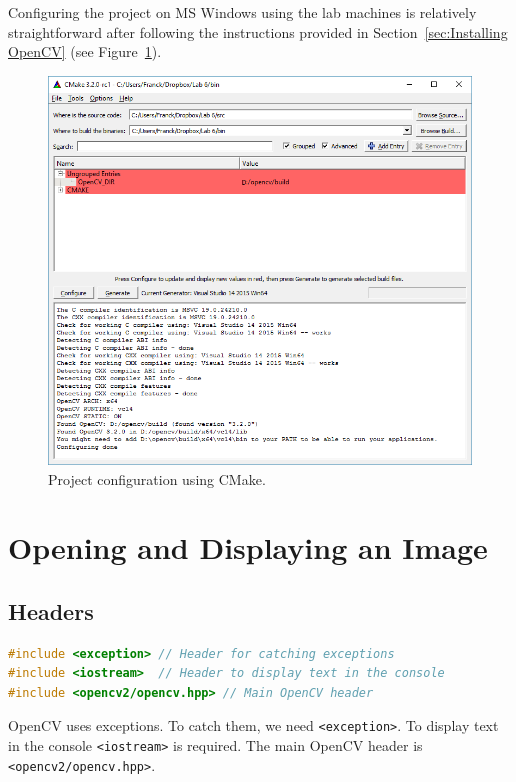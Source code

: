 \documentclass[english,a4paper,12pt,oneside]{article}
\begin{document}
Configuring the project on MS Windows using the lab machines is relatively straightforward after following the instructions provided in Section~\ref{sec:Installing OpenCV} (see Figure~\ref{fig:config proj}). 
	\begin{figure}[tbhp]
	\includegraphics[width=\textwidth]{cmake}
	\caption{\label{fig:config proj}Project configuration using CMake.}
\end{figure}


\newpage
\section{Opening and Displaying an Image}


\subsection{Headers}


\begin{lstlisting}[language=c++,caption=Header files.]
#include <exception> // Header for catching exceptions
#include <iostream>  // Header to display text in the console
#include <opencv2/opencv.hpp> // Main OpenCV header
\end{lstlisting}

OpenCV uses exceptions. To catch them, we need \verb+<exception>+. 
To display text in the console \verb+<iostream>+ is required. 
The main OpenCV header is \verb+<opencv2/opencv.hpp>+.
\end{document}
